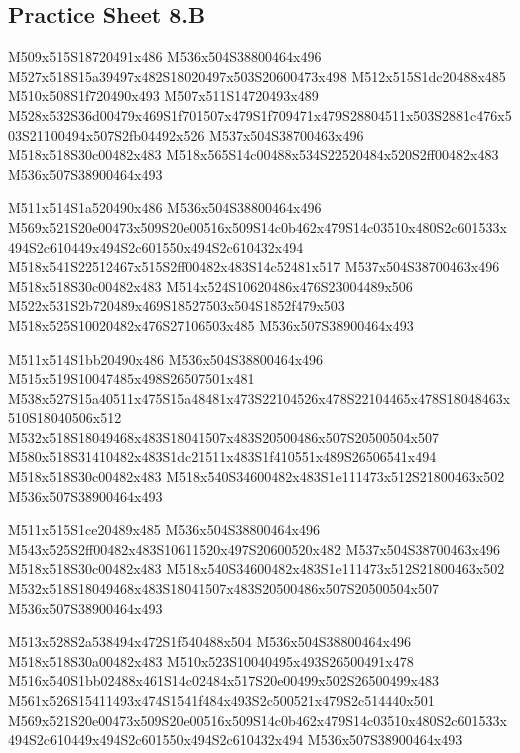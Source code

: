 \documentclass{article}
\begin{document}
\subsection{Practice Sheet 8.B}

\begin{multicols}{5}
\begin{center}

M509x515S18720491x486 %
M536x504S38800464x496 %
M527x518S15a39497x482S18020497x503S20600473x498 %
M512x515S1dc20488x485 %
M510x508S1f720490x493 %
M507x511S14720493x489 %
M528x532S36d00479x469S1f701507x479S1f709471x479S28804511x503S2881c476x503S21100494x507S2fb04492x526 %
M537x504S38700463x496 %
M518x518S30c00482x483 %
M518x565S14c00488x534S22520484x520S2ff00482x483 %
M536x507S38900464x493 %
\vfil
\columnbreak

M511x514S1a520490x486 %
M536x504S38800464x496 %
M569x521S20e00473x509S20e00516x509S14c0b462x479S14c03510x480S2c601533x494S2c610449x494S2c601550x494S2c610432x494 %
M518x541S22512467x515S2ff00482x483S14c52481x517 %
M537x504S38700463x496 %
M518x518S30c00482x483 %
M514x524S10620486x476S23004489x506 %
M522x531S2b720489x469S18527503x504S1852f479x503 %
M518x525S10020482x476S27106503x485 %
M536x507S38900464x493 %
\vfil
\columnbreak

M511x514S1bb20490x486 %
M536x504S38800464x496 %
M515x519S10047485x498S26507501x481 %
M538x527S15a40511x475S15a48481x473S22104526x478S22104465x478S18048463x510S18040506x512 %
M532x518S18049468x483S18041507x483S20500486x507S20500504x507 %
M580x518S31410482x483S1dc21511x483S1f410551x489S26506541x494 %
M518x518S30c00482x483 %
M518x540S34600482x483S1e111473x512S21800463x502 %
M536x507S38900464x493 %
\vfil
\columnbreak

M511x515S1ce20489x485 %
M536x504S38800464x496 %
M543x525S2ff00482x483S10611520x497S20600520x482 %
M537x504S38700463x496 %
M518x518S30c00482x483 %
M518x540S34600482x483S1e111473x512S21800463x502 %
M532x518S18049468x483S18041507x483S20500486x507S20500504x507 %
M536x507S38900464x493 %
\vfil
\columnbreak

M513x528S2a538494x472S1f540488x504 %
M536x504S38800464x496 %
M518x518S30a00482x483 %
M510x523S10040495x493S26500491x478 %
M516x540S1bb02488x461S14c02484x517S20e00499x502S26500499x483 %
M561x526S15411493x474S1541f484x493S2c500521x479S2c514440x501 %
M569x521S20e00473x509S20e00516x509S14c0b462x479S14c03510x480S2c601533x494S2c610449x494S2c601550x494S2c610432x494 %
M536x507S38900464x493 %
\vfil

\end{center}
\end{multicols}
\end{document}

